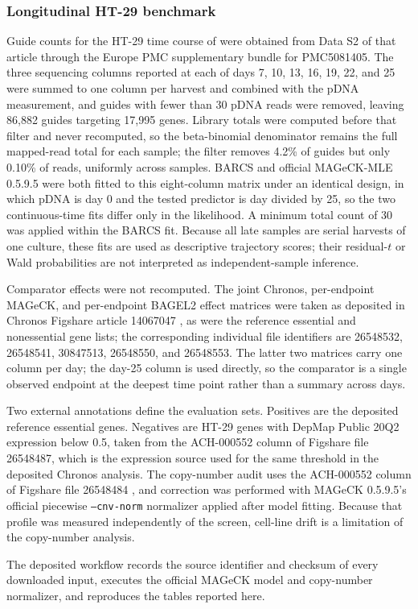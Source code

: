\subsubsection{Longitudinal HT-29 benchmark}

Guide counts for the HT-29 time course of \citet{tzelepis2016dropout} were
obtained from Data S2 of that article through the Europe PMC supplementary
bundle for PMC5081405.  The three sequencing columns reported
at each of days 7, 10, 13, 16, 19, 22, and 25 were summed to one column per
harvest and combined with the pDNA measurement, and guides with fewer than 30
pDNA reads were removed, leaving 86,882 guides targeting 17,995 genes.  Library
totals were computed before that filter and never recomputed, so the
beta-binomial denominator remains the full mapped-read total for each sample;
the filter removes 4.2\% of guides but only 0.10\% of reads, uniformly across
samples.  BARCS
and official MAGeCK-MLE 0.5.9.5 were both fitted to this eight-column matrix
under an identical design, in which pDNA is day 0 and the tested predictor is
day divided by 25, so the two continuous-time fits differ only in the
likelihood.  A minimum total count of 30 was applied within the BARCS fit.
Because all late samples are serial harvests of one culture, these fits are
used as descriptive trajectory scores; their residual-$t$ or Wald
probabilities are not interpreted as independent-sample inference.

Comparator effects were not recomputed.  The joint Chronos, per-endpoint
MAGeCK, and per-endpoint BAGEL2 effect matrices were taken as deposited in
Chronos Figshare article 14067047 \citep{chronosfigshare2021}, as were the
reference essential and nonessential gene lists; the corresponding individual
file identifiers are 26548532, 26548541, 30847513, 26548550, and 26548553.
The latter two matrices carry one column per day; the day-25 column is used
directly, so the comparator is a single observed endpoint at the deepest time
point rather than a summary across days.

Two external annotations define the evaluation sets.  Positives are the
deposited reference essential genes.  Negatives are HT-29 genes with DepMap
Public 20Q2 expression below 0.5, taken from the ACH-000552 column of Figshare
file 26548487, which is the expression source used for the same threshold in the
deposited Chronos analysis.  The copy-number audit uses the ACH-000552 column of
Figshare file 26548484 \citep{depmap20q2}, and correction was performed with
MAGeCK 0.5.9.5's official piecewise \texttt{--cnv-norm} normalizer applied after
model fitting.  Because that profile was measured independently of the screen,
cell-line drift is a limitation of the copy-number analysis.

The deposited workflow records the source identifier and checksum of every
downloaded input, executes the official MAGeCK model and copy-number
normalizer, and reproduces the tables reported here.
